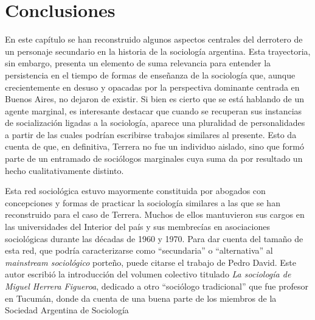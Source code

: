 \section{Conclusiones}

En este capítulo se han reconstruido algunos aspectos centrales del derrotero de un personaje secundario en la historia de la sociología argentina. Esta trayectoria, sin embargo, presenta un elemento de suma relevancia para entender la persistencia en el tiempo de formas de enseñanza de la sociología que, aunque crecientemente en desuso y opacadas por la perspectiva dominante centrada en Buenos Aires, no dejaron de existir. Si bien es cierto que se está hablando de un agente marginal, es interesante destacar que cuando se recuperan sus instancias de socialización ligadas a la sociología, aparece una pluralidad de personalidades a partir de las cuales podrían escribirse trabajos similares al presente. Esto da cuenta de que, en definitiva, Terrera no fue un individuo aislado, sino que formó parte de un entramado de sociólogos marginales cuya suma da por resultado un hecho cualitativamente distinto.

Esta red sociológica estuvo mayormente constituida por abogados con concepciones y formas de practicar la sociología similares a las que se han reconstruido para el caso de Terrera. Muchos de ellos mantuvieron sus cargos en las universidades del Interior del país y sus membrecías en asociaciones sociológicas durante las décadas de 1960 y 1970. Para dar cuenta del tamaño de esta red, que podría caracterizarse como ``secundaria'' o ``alternativa'' al \emph{mainstream sociológico} porteño, puede citarse el trabajo de Pedro David. Este autor escribió la introducción del volumen colectivo titulado \emph{La sociología de Miguel Herrera Figueroa}, dedicado a otro ``sociólogo tradicional'' que fue profesor en Tucumán, donde da cuenta de una buena parte de los miembros de la Sociedad Argentina de Sociología

